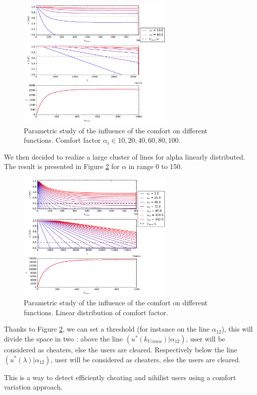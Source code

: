\documentclass[conference]{IEEEtran}
\begin{document}
\begin{figure}[!t]
\centering
\includegraphics[width=3in]{KL_10-80.pdf}
\caption{Parametric study of the influence of the comfort on different functions. Comfort factor $\alpha_i \in {10, 20, 40, 60, 80, 100}$.}
\label{CM_2}
\end{figure}

We then decided to realize a large cluster of lines for alpha linearly distributed. The result is presented in Figure \ref{CM_3} for $\alpha$ in range 0 to 150. 

\begin{figure}[!t]
\centering
\includegraphics[width=3in]{KL_lin.pdf}
\caption{Parametric study of the influence of the comfort on different functions. Linear distribution of comfort factor.}
\label{CM_3}
\end{figure}

Thanks to Figure \ref{CM_3}, we can set a threshold (for instance on the line $\alpha_{12}$), this will divide the space in two : above the line $(u^*(k_{Uzawa}) | \alpha_{12})$, user will be considered as cheaters, else the users are cleared. Respectively below the line $(u^*(\lambda) | \alpha_{12})$, user will be considered as cheaters, else the users are cleared.

This is a way to detect efficiently cheating and nihilist users using a comfort variation approach.  
\end{document}
